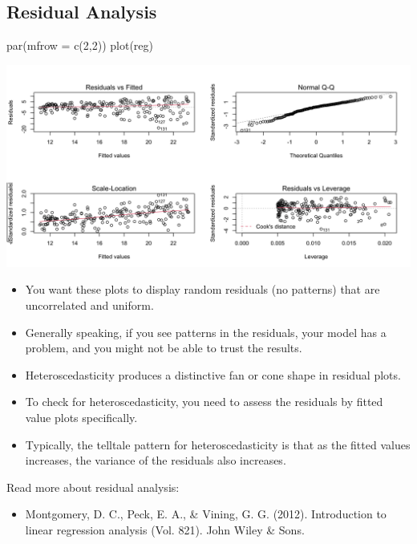 \documentclass[
]{book}
\newenvironment{Shaded}{\begin{snugshade}}{\end{snugshade}}
\newcommand{\AttributeTok}[1]{\textcolor[rgb]{0.77,0.63,0.00}{#1}}
\newcommand{\DecValTok}[1]{\textcolor[rgb]{0.00,0.00,0.81}{#1}}
\newcommand{\FunctionTok}[1]{\textcolor[rgb]{0.00,0.00,0.00}{#1}}
\newcommand{\NormalTok}[1]{#1}
\providecommand{\tightlist}{%
  \setlength{\itemsep}{0pt}\setlength{\parskip}{0pt}}
\begin{document}
\hypertarget{residual-analysis}{%
\subsection{Residual Analysis}\label{residual-analysis}}

\begin{Shaded}
\begin{Highlighting}[]
\FunctionTok{par}\NormalTok{(}\AttributeTok{mfrow =} \FunctionTok{c}\NormalTok{(}\DecValTok{2}\NormalTok{,}\DecValTok{2}\NormalTok{))}
\FunctionTok{plot}\NormalTok{(reg)}
\end{Highlighting}
\end{Shaded}

\begin{center}\includegraphics{figure/unnamed-chunk-29-1} \end{center}

\begin{itemize}
\item
  You want these plots to display random residuals (no patterns) that are uncorrelated and uniform.
\item
  Generally speaking, if you see patterns in the residuals, your model has a problem, and you might not be able to trust the results.
\item
  Heteroscedasticity produces a distinctive fan or cone shape in residual plots.
\item
  To check for heteroscedasticity, you need to assess the residuals by fitted value plots specifically.
\item
  Typically, the telltale pattern for heteroscedasticity is that as the fitted values increases, the variance of the residuals also increases.
\end{itemize}

Read more about residual analysis:

\begin{itemize}
\tightlist
\item
  Montgomery, D. C., Peck, E. A., \& Vining, G. G. (2012). Introduction to linear regression analysis (Vol. 821). John Wiley \& Sons.
\end{itemize}
\end{document}
